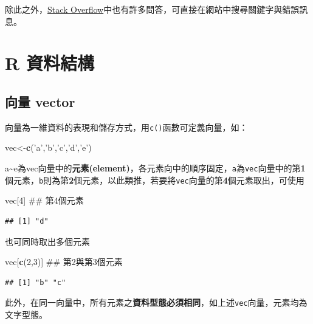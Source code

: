 \documentclass[]{book}
\newenvironment{Shaded}{\begin{snugshade}}{\end{snugshade}}
\newcommand{\KeywordTok}[1]{\textcolor[rgb]{0.13,0.29,0.53}{\textbf{{#1}}}}
\newcommand{\DecValTok}[1]{\textcolor[rgb]{0.00,0.00,0.81}{{#1}}}
\newcommand{\StringTok}[1]{\textcolor[rgb]{0.31,0.60,0.02}{{#1}}}
\newcommand{\NormalTok}[1]{{#1}}
\theoremstyle{definition}
\theoremstyle{definition}
\theoremstyle{remark}
\begin{document}
除此之外，\href{http://stackoverflow.com/}{Stack
Overflow}中也有許多問答，可直接在網站中搜尋關鍵字與錯誤訊息。

\chapter{R 資料結構}\label{RDataStructure}

\section{向量 vector}\label{-vector}

向量為一維資料的表現和儲存方式，用\texttt{c()}函數可定義向量，如：

\begin{Shaded}
\begin{Highlighting}[]
\NormalTok{vec<-}\KeywordTok{c}\NormalTok{(}\StringTok{'a'}\NormalTok{,}\StringTok{'b'}\NormalTok{,}\StringTok{'c'}\NormalTok{,}\StringTok{'d'}\NormalTok{,}\StringTok{'e'}\NormalTok{)}
\end{Highlighting}
\end{Shaded}

a\textasciitilde{}e為vec向量中的\textbf{元素(element)}，各元素向中的順序固定，\texttt{a}為\texttt{vec}向量中的第\textbf{1}個元素，\texttt{b}則為第\textbf{2}個元素，以此類推，若要將\texttt{vec}向量的第\textbf{4}個元素取出，可使用

\begin{Shaded}
\begin{Highlighting}[]
\NormalTok{vec[}\DecValTok{4}\NormalTok{] ## 第4個元素}
\end{Highlighting}
\end{Shaded}

\begin{verbatim}
## [1] "d"
\end{verbatim}

也可同時取出多個元素

\begin{Shaded}
\begin{Highlighting}[]
\NormalTok{vec[}\KeywordTok{c}\NormalTok{(}\DecValTok{2}\NormalTok{,}\DecValTok{3}\NormalTok{)] ## 第2與第3個元素}
\end{Highlighting}
\end{Shaded}

\begin{verbatim}
## [1] "b" "c"
\end{verbatim}

此外，在同一向量中，所有元素之\textbf{資料型態必須相同}，如上述\texttt{vec}向量，元素均為文字型態。
\end{document}
